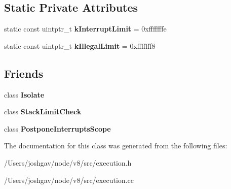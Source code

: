 \subsection*{Static Private Attributes}
\begin{DoxyCompactItemize}
\item 
static const uintptr\+\_\+t {\bfseries k\+Interrupt\+Limit} = 0xfffffffe\hypertarget{classv8_1_1internal_1_1_stack_guard_a61a72c61781826b2a7f88531e431348d}{}\label{classv8_1_1internal_1_1_stack_guard_a61a72c61781826b2a7f88531e431348d}

\item 
static const uintptr\+\_\+t {\bfseries k\+Illegal\+Limit} = 0xfffffff8\hypertarget{classv8_1_1internal_1_1_stack_guard_ac53ef7cc7ba29d830d9745cb904302a9}{}\label{classv8_1_1internal_1_1_stack_guard_ac53ef7cc7ba29d830d9745cb904302a9}

\end{DoxyCompactItemize}
\subsection*{Friends}
\begin{DoxyCompactItemize}
\item 
class {\bfseries Isolate}\hypertarget{classv8_1_1internal_1_1_stack_guard_aba4f0964bdacf2bbf62cf876e5d28d0a}{}\label{classv8_1_1internal_1_1_stack_guard_aba4f0964bdacf2bbf62cf876e5d28d0a}

\item 
class {\bfseries Stack\+Limit\+Check}\hypertarget{classv8_1_1internal_1_1_stack_guard_ad886bb634836d54ec18f36a04e2a4a3c}{}\label{classv8_1_1internal_1_1_stack_guard_ad886bb634836d54ec18f36a04e2a4a3c}

\item 
class {\bfseries Postpone\+Interrupts\+Scope}\hypertarget{classv8_1_1internal_1_1_stack_guard_ab43c863bdc4122cb9a67b3ded46d6672}{}\label{classv8_1_1internal_1_1_stack_guard_ab43c863bdc4122cb9a67b3ded46d6672}

\end{DoxyCompactItemize}


The documentation for this class was generated from the following files\+:\begin{DoxyCompactItemize}
\item 
/\+Users/joshgav/node/v8/src/execution.\+h\item 
/\+Users/joshgav/node/v8/src/execution.\+cc\end{DoxyCompactItemize}
